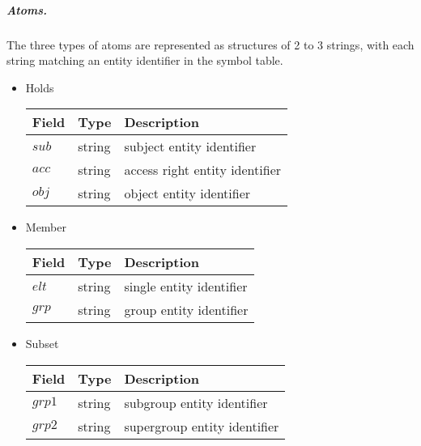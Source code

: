 \documentclass[10pt, twocolumn]{article}
\begin{document}
          \subparagraph{Atoms.}

            The three types of atoms are represented as structures of 2 to 3
            strings, with each string matching an entity identifier in the
            symbol table.

            \begin{itemize}
              \item
                Holds \\
                \begin{tabular}[t]{|l|l|l|}
                  \hline
                  \textbf{Field} & \textbf{Type} & \textbf{Description} \\
                  \hline
                  $sub$ & string & subject entity identifier \\
                  \hline
                  $acc$ & string & access right entity identifier \\
                  \hline
                  $obj$ & string & object entity identifier \\
                  \hline
                \end{tabular}

              \item
                Member \\
                \begin{tabular}[t]{|l|l|l|}
                  \hline
                  \textbf{Field} & \textbf{Type} & \textbf{Description} \\
                  \hline
                  $elt$ & string & single entity identifier \\
                  \hline
                  $grp$ & string & group entity identifier \\
                  \hline
                \end{tabular}

              \item
                Subset \\
                \begin{tabular}[t]{|l|l|l|}
                  \hline
                  \textbf{Field} & \textbf{Type} & \textbf{Description} \\
                  \hline
                  $grp1$ & string & subgroup entity identifier \\
                  \hline
                  $grp2$ & string & supergroup entity identifier \\
                  \hline
                \end{tabular}
              \end{itemize}
\end{document}
